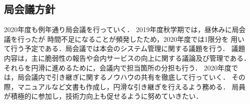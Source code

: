 \subsection*{局会議方針}


 2020年度も例年通り局会議を行っていく．
 2019年度秋学期では，昼休みに局会議を行ったが
 時間不足になることが頻発したため，2020年度では1限分を
 用いて行う予定である．局会議では本会のシステム管理に関する議題を行う．
 議題内容は，主に脆弱性の報告や会内サービスの向上に関する議論及び管理である．
 それらを円滑に進めるために，会議内で担当箇所の分担も行う．
 2020年度では，局会議内で引き継ぎに関するノウハウの共有を徹底して行っていく．
 その際，マニュアルなど文書も作成し，円滑な引き継ぎを行えるよう務める．
 局員が積極的に参加し，技術力向上も促せるように努めていきたい．
